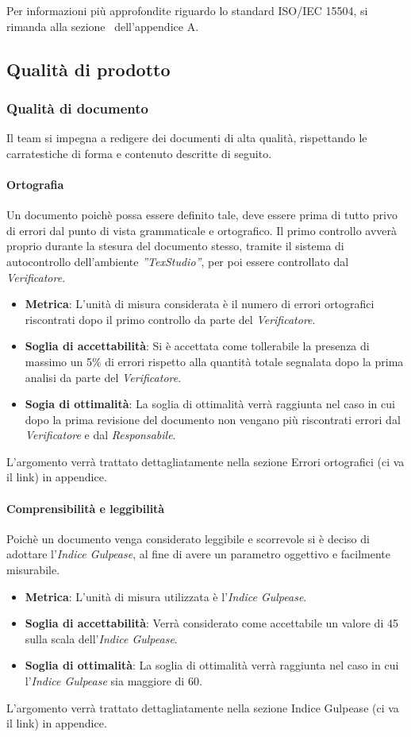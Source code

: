 Per informazioni più approfondite riguardo lo standard ISO/IEC 15504, si rimanda alla sezione~ dell'appendice A.

\subsection{Qualità di prodotto}
\subsubsection{Qualità di documento}
Il team si impegna a redigere dei documenti di alta qualità, rispettando le carratestiche di forma e contenuto descritte di seguito.
\paragraph{Ortografia}
Un documento poichè possa essere definito tale, deve essere prima di tutto privo di errori dal punto di vista grammaticale e ortografico. 
Il primo controllo avverà proprio durante la stesura del documento stesso, tramite il sistema di autocontrollo dell'ambiente  \emph{''TexStudio''}, per poi essere controllato dal  \emph{Verificatore}.
\begin{itemize}
	\item \textbf{Metrica}: L'unità di misura considerata è il numero di errori ortografici riscontrati dopo il primo controllo da parte del \emph{Verificatore}.
	\item \textbf{Soglia di accettabilità}: Si è accettata come tollerabile la presenza di massimo un 5\% di errori rispetto alla quantità totale segnalata dopo la prima analisi da parte del \emph{Verificatore}.
	\item \textbf{Sogia di ottimalità}: La soglia di ottimalità verrà raggiunta nel caso in cui dopo la prima revisione del documento non vengano più riscontrati errori dal \emph{Verificatore} e dal \emph{Responsabile}.
\end{itemize}
L'argomento verrà trattato dettagliatamente nella sezione Errori ortografici (ci va il link) in appendice.
\paragraph{Comprensibilità e leggibilità}
Poichè un documento venga considerato leggibile e scorrevole si è deciso di adottare l'\emph{Indice Gulpease}, al fine di avere un parametro oggettivo e facilmente misurabile.
\begin{itemize}
	\item \textbf{Metrica}: L'unità di misura utilizzata è l'\emph{Indice Gulpease}.
	\item \textbf{Soglia di accettabilità}: Verrà considerato come accettabile un valore di 45 sulla scala dell'\emph{Indice Gulpease}.
	\item \textbf{Soglia di ottimalità}: La soglia di ottimalità verrà raggiunta nel caso in cui l'\emph{Indice Gulpease} sia maggiore di 60.
\end{itemize}
L'argomento verrà trattato dettagliatamente nella sezione Indice Gulpease (ci va il link) in appendice.
